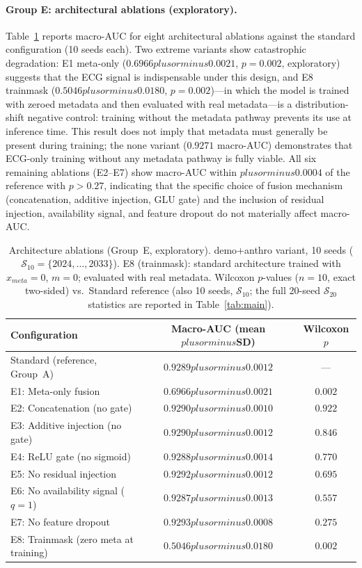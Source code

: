\documentclass[mathematics,article,pdftex]{Definitions/mdpi}
\def\texttt#1{#1}%
\def\mathrm#1{#1}%
\def\mathbf#1{#1}%
\def\textbf#1{#1}%
\def\pm{plus or minus }%
\begin{document}
\paragraph{Group E: architectural ablations (exploratory).}
Table~\ref{tab:group_e} reports macro-AUC for eight architectural ablations against the standard configuration (10 seeds each). Two extreme variants show catastrophic degradation: \textbf{E1 meta-only} ($0.6966{\pm}0.0021$, $p{=}0.002$, exploratory) suggests that the ECG signal is indispensable under this design, and \textbf{E8 trainmask} ($0.5046{\pm}0.0180$, $p{=}0.002$)---in which the model is trained with zeroed metadata and then evaluated with real metadata---is a distribution-shift negative control: training without the metadata pathway prevents its use at inference time. This result does not imply that metadata must generally be present during training; the \texttt{none} variant ($0.9271$ macro-AUC) demonstrates that ECG-only training without any metadata pathway is fully viable. All six remaining ablations (E2--E7) show macro-AUC within $\pm0.0004$ of the reference with $p{>}0.27$, indicating that the specific choice of fusion mechanism (concatenation, additive injection, GLU gate) and the inclusion of residual injection, availability signal, and feature dropout do not materially affect macro-AUC.

\begin{table}[H]
\caption{Architecture ablations (Group~E, exploratory). \texttt{demo+anthro} variant, 10 seeds ($\mathcal{S}_{10}{=}\{2024,\ldots,2033\}$). E8 (\texttt{trainmask}): standard architecture trained with $\mathbf{x}_{\mathrm{meta}}{=}\mathbf{0}$, $\mathbf{m}{=}\mathbf{0}$; evaluated with real metadata. Wilcoxon $p$-values ($n{=}10$, exact two-sided) vs.\ Standard reference (also 10 seeds, $\mathcal{S}_{10}$; the full 20-seed $\mathcal{S}_{20}$ statistics are reported in Table~\ref{tab:main}).}\label{tab:group_e}
\small\centering
\begin{tabular}{lcc}
\toprule
\textbf{Configuration} & \textbf{Macro-AUC (mean$\pm$SD)} & \textbf{Wilcoxon $p$} \\
\midrule
Standard (reference, Group~A) & $0.9289\pm0.0012$ & --- \\
E1: Meta-only fusion           & $0.6966\pm0.0021$ & $0.002$ \\
E2: Concatenation (no gate)    & $0.9290\pm0.0010$ & $0.922$ \\
E3: Additive injection (no gate) & $0.9290\pm0.0012$ & $0.846$ \\
E4: ReLU gate (no sigmoid)     & $0.9288\pm0.0014$ & $0.770$ \\
E5: No residual injection      & $0.9292\pm0.0012$ & $0.695$ \\
E6: No availability signal ($q{=}1$) & $0.9287\pm0.0013$ & $0.557$ \\
E7: No feature dropout         & $0.9293\pm0.0008$ & $0.275$ \\
E8: Trainmask (zero meta at training) & $0.5046\pm0.0180$ & $0.002$ \\
\bottomrule
\end{tabular}
\end{table}
\end{document}
